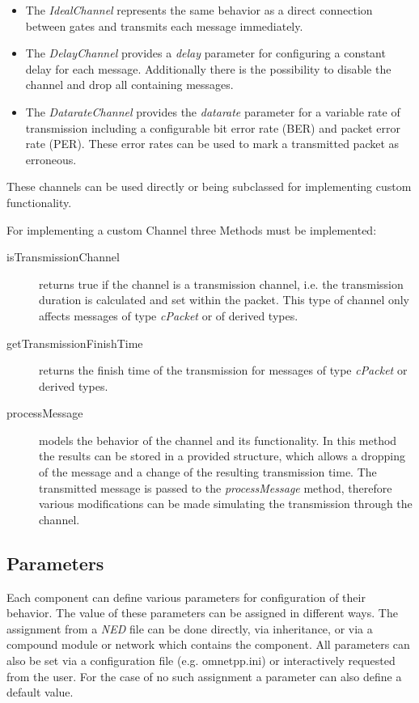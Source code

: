 \begin{itemize}
    \item The \emph{IdealChannel} represents the same behavior as a direct connection between gates and transmits each message immediately.
    \item The \emph{DelayChannel} provides a \emph{delay} parameter for configuring a constant delay for each message.
    Additionally there is the possibility to disable the channel and drop all containing messages.
    \item The \emph{DatarateChannel} provides the \emph{datarate} parameter for a variable rate of transmission including a configurable bit error rate (BER) and packet error rate (PER).
    These error rates can be used to mark a transmitted packet as erroneous.
\end{itemize}

These channels can be used directly or being subclassed for implementing custom functionality. \cite[section 3.5]{omnet_manual}

For implementing a custom Channel three Methods must be implemented:

\begin{description}
    \item[isTransmissionChannel] returns true if the channel is a transmission channel, i.e. the transmission duration is calculated and set within the packet.
    This type of channel only affects messages of type \emph{cPacket} or of derived types.
    \item[getTransmissionFinishTime] returns the finish time of the transmission for messages of type \emph{cPacket} or derived types.
    \item[processMessage] models the behavior of the channel and its functionality.
    In this method the results can be stored in a provided structure, which allows a dropping of the message and a change of the resulting transmission time.
    The transmitted message is passed to the \emph{processMessage} method, therefore various modifications can be made simulating the transmission through the channel. \cite[section 4.8]{omnet_manual}
\end{description}

\subsection{Parameters}
\label{sec:omnet_components_parameters}
Each component can define various parameters for configuration of their behavior.
The value of these parameters can be assigned in different ways.
The assignment from a \emph{NED} file can be done directly, via inheritance, or via a compound module or network which contains the component.
All parameters can also be set via a configuration file (e.g. omnetpp.ini) or interactively requested from the user.
For the case of no such assignment a parameter can also define a default value.

